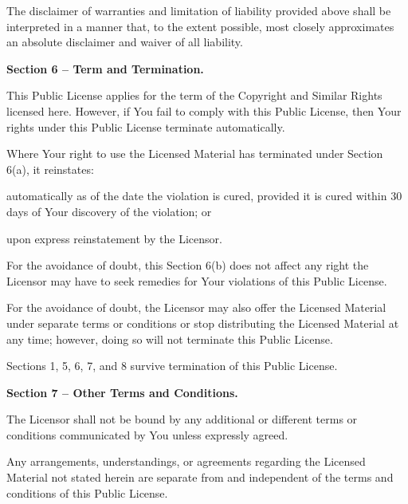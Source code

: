 \begin{doclicense@enumerate}
\item The disclaimer of warranties and limitation of liability provided above shall be interpreted in a manner that, to the extent possible, most closely approximates an absolute disclaimer and waiver of all liability.
\end{doclicense@enumerate}
\par \textbf{Section 6 – Term and Termination.}
\begin{doclicense@enumerate}
\item This Public License applies for the term of the Copyright and Similar Rights licensed here. However, if You fail to comply with this Public License, then Your rights under this Public License terminate automatically.
\item 
\par Where Your right to use the Licensed Material has terminated under Section 6(a), it reinstates:
\begin{doclicense@enumerate}
\item automatically as of the date the violation is cured, provided it is cured within 30 days of Your discovery of the violation; or
\item upon express reinstatement by the Licensor.
\end{doclicense@enumerate}
For the avoidance of doubt, this Section 6(b) does not affect any right the Licensor may have to seek remedies for Your violations of this Public License.
\item For the avoidance of doubt, the Licensor may also offer the Licensed Material under separate terms or conditions or stop distributing the Licensed Material at any time; however, doing so will not terminate this Public License.
\item Sections 1, 5, 6, 7, and 8 survive termination of this Public License.
\end{doclicense@enumerate}
\par \textbf{Section 7 – Other Terms and Conditions.}
\begin{doclicense@enumerate}
\item The Licensor shall not be bound by any additional or different terms or conditions communicated by You unless expressly agreed.
\item Any arrangements, understandings, or agreements regarding the Licensed Material not stated herein are separate from and independent of the terms and conditions of this Public License.
\end{doclicense@enumerate}

